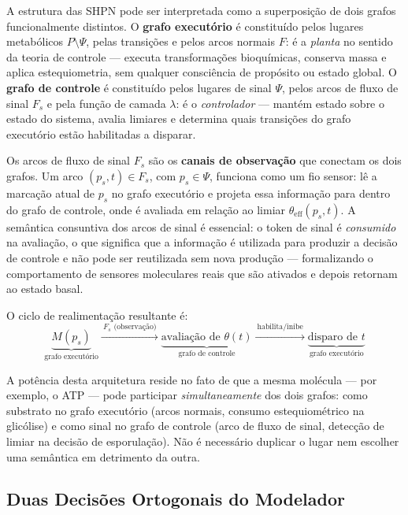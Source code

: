 \begin{remark}
\label{rem:dual-graph}
A estrutura das SHPN pode ser interpretada como a superposição de dois grafos
funcionalmente distintos. O \textbf{grafo executório} é constituído pelos
lugares metabólicos $P \setminus \Psi$, pelas transições e pelos arcos normais
$F$: é a \emph{planta} no sentido da teoria de controle --- executa
transformações bioquímicas, conserva massa e aplica estequiometria, sem
qualquer consciência de propósito ou estado global. O \textbf{grafo de controle}
é constituído pelos lugares de sinal $\Psi$, pelos arcos de fluxo de sinal $F_s$
e pela função de camada $\lambda$: é o \emph{controlador} --- mantém estado
sobre o estado do sistema, avalia limiares e determina quais transições do grafo
executório estão habilitadas a disparar.

Os arcos de fluxo de sinal $F_s$ são os \textbf{canais de observação} que
conectam os dois grafos. Um arco $(p_s, t) \in F_s$, com $p_s \in \Psi$,
funciona como um fio sensor: lê a marcação atual de $p_s$ no grafo executório e
projeta essa informação para dentro do grafo de controle, onde é avaliada em
relação ao limiar $\theta_{\mathrm{eff}}(p_s,t)$. A semântica consuntiva dos arcos de sinal é
essencial: o token de sinal é \emph{consumido} na avaliação, o que significa que
a informação é utilizada para produzir a decisão de controle e não pode ser
reutilizada sem nova produção --- formalizando o comportamento de sensores
moleculares reais que são ativados e depois retornam ao estado basal.

O ciclo de realimentação resultante é:
\[
\underbrace{M(p_s)}_{\text{grafo executório}}
\xrightarrow{\ F_s \text{ (observação)}\ }
\underbrace{\text{avaliação de } \theta(t)}_{\text{grafo de controle}}
\xrightarrow{\ \text{habilita/inibe}\ }
\underbrace{\text{disparo de } t}_{\text{grafo executório}}
\]

A potência desta arquitetura reside no fato de que a mesma molécula --- por
exemplo, o ATP --- pode participar \emph{simultaneamente} dos dois grafos: como
substrato no grafo executório (arcos normais, consumo estequiométrico na
glicólise) e como sinal no grafo de controle (arco de fluxo de sinal, detecção
de limiar na decisão de esporulação). Não é necessário duplicar o lugar nem
escolher uma semântica em detrimento da outra.
\end{remark}

\subsection{Duas Decisões Ortogonais do Modelador}
\label{subsec:decisoes-modelador}

